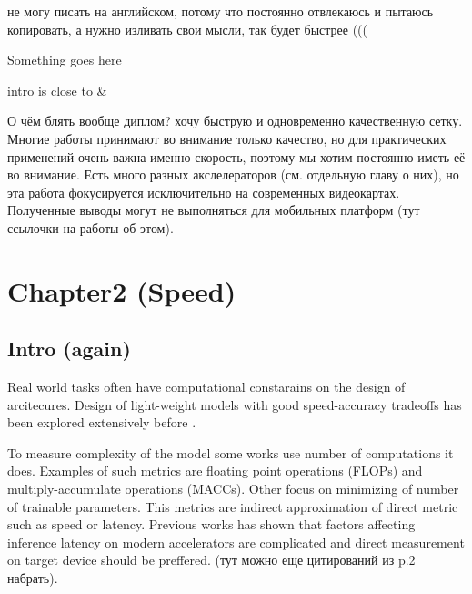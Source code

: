 не могу писать на английском, потому что постоянно отвлекаюсь и пытаюсь копировать, а нужно изливать свои мысли, так будет быстрее (((




Something goes here

intro is close to \cite{lin2020neural_genet} & \cite{ridnik2021_tresnet}

О чём блять вообще диплом? хочу быструю и одновременно качественную сетку. 
Многие работы принимают во внимание только качество, но для практических применений очень важна именно скорость, поэтому мы хотим постоянно иметь её во внимание. Есть много разных акслелераторов (см. отдельную главу о них), но эта работа фокусируется исключительно на современных видеокартах. Полученные выводы могут не выполняться для мобильных платформ (тут ссылочки на работы об этом). 


\chapter{Chapter2 (Speed)}



\section{Intro (again)}

Real world tasks often have computational constarains on the design of arcitecures. Design of light-weight models with good speed-accuracy tradeoffs has been explored extensively before \cite{howard2017mobilenetv1} \cite{mobilenetv2} \cite{ma2018shufflenetv2} \cite{zhang2018shufflenet}.  %

To measure complexity of the model some works use number of computations it does. Examples of such metrics are floating point operations (FLOPs) and multiply-accumulate operations (MACCs). Other focus on minimizing of number of trainable parameters. This metrics are indirect approximation of direct metric such as speed or latency. Previous works has shown \cite{design_spaces} that factors affecting inference latency on modern accelerators are complicated and direct measurement on target device should be preffered. (тут можно еще цитирований из \cite{ma2018shufflenetv2} p.2 набрать).

